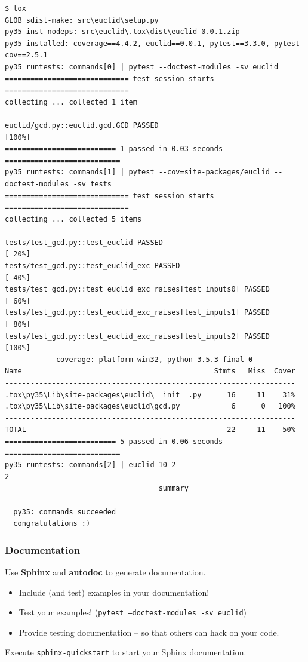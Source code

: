 \documentclass{beamer} %
\newcommand\emc[1]{\textcolor{midred}{\textbf{#1}}}
\begin{document}
\begin{frame}[fragile]
\begin{tiny}
\begin{verbatim}
$ tox
GLOB sdist-make: src\euclid\setup.py
py35 inst-nodeps: src\euclid\.tox\dist\euclid-0.0.1.zip
py35 installed: coverage==4.4.2, euclid==0.0.1, pytest==3.3.0, pytest-cov==2.5.1
py35 runtests: commands[0] | pytest --doctest-modules -sv euclid
============================= test session starts =============================
collecting ... collected 1 item

euclid/gcd.py::euclid.gcd.GCD PASSED                                     [100%]
========================== 1 passed in 0.03 seconds ===========================
py35 runtests: commands[1] | pytest --cov=site-packages/euclid --doctest-modules -sv tests
============================= test session starts =============================
collecting ... collected 5 items

tests/test_gcd.py::test_euclid PASSED                                    [ 20%]
tests/test_gcd.py::test_euclid_exc PASSED                                [ 40%]
tests/test_gcd.py::test_euclid_exc_raises[test_inputs0] PASSED           [ 60%]
tests/test_gcd.py::test_euclid_exc_raises[test_inputs1] PASSED           [ 80%]
tests/test_gcd.py::test_euclid_exc_raises[test_inputs2] PASSED           [100%]
----------- coverage: platform win32, python 3.5.3-final-0 -----------
Name                                             Stmts   Miss  Cover
--------------------------------------------------------------------
.tox\py35\Lib\site-packages\euclid\__init__.py      16     11    31%
.tox\py35\Lib\site-packages\euclid\gcd.py            6      0   100%
--------------------------------------------------------------------
TOTAL                                               22     11    50%
========================== 5 passed in 0.06 seconds ===========================
py35 runtests: commands[2] | euclid 10 2
2
___________________________________ summary ___________________________________
  py35: commands succeeded
  congratulations :)
\end{verbatim}
\end{tiny}

\end{frame}

\begin{frame}

\frametitle{Documentation}

Use \emc{Sphinx} and \emc{autodoc} to generate documentation. 
\begin{itemize}
  \item Include (and test) examples in your documentation!
  \item Test your examples! (\texttt{pytest --doctest-modules -sv euclid})
  \item Provide testing documentation -- so that others can hack on your code.
\end{itemize}

\vspace{3mm}
Execute \texttt{sphinx-quickstart} to start your Sphinx documentation.
\end{frame}
\end{document}
